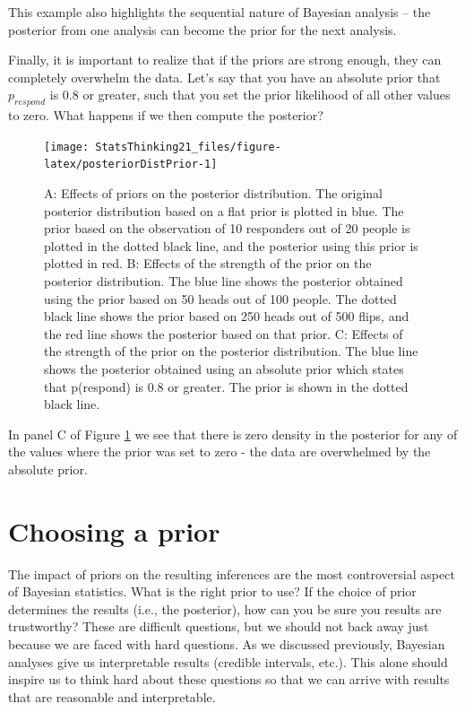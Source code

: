 \documentclass[12pt,]{book}
\theoremstyle{definition}
\theoremstyle{definition}
\theoremstyle{definition}
\theoremstyle{remark}
\begin{document}
This example also highlights the sequential nature of Bayesian analysis -- the posterior from one analysis can become the prior for the next analysis.

Finally, it is important to realize that if the priors are strong enough, they can completely overwhelm the data. Let's say that you have an absolute prior that \(p_{respond}\) is 0.8 or greater, such that you set the prior likelihood of all other values to zero. What happens if we then compute the posterior?

\begin{figure}
\texttt{[image: StatsThinking21\_files/figure-latex/posteriorDistPrior-1]} \caption{A: Effects of priors on the posterior distribution.  The original posterior distribution based on a flat prior is plotted in blue. The prior based on the observation of 10 responders out of 20 people is plotted in the dotted black line, and the posterior using this prior is plotted in red.  B: Effects of the strength of the prior on the posterior distribution. The blue line shows the posterior obtained using the prior based on 50 heads out of 100 people.  The dotted black line shows the prior based on 250 heads out of 500 flips, and the red line shows the posterior based on that prior. C: Effects of the strength of the prior on the posterior distribution. The blue line shows the posterior obtained using an absolute prior which states that p(respond) is 0.8 or greater.  The prior is shown in the dotted black line.}\label{fig:posteriorDistPrior}
\end{figure}

In panel C of Figure \ref{fig:posteriorDistPrior} we see that there is zero density in the posterior for any of the values where the prior was set to zero - the data are overwhelmed by the absolute prior.

\hypertarget{choosing-a-prior}{%
\section{Choosing a prior}\label{choosing-a-prior}}

The impact of priors on the resulting inferences are the most controversial aspect of Bayesian statistics. What is the right prior to use? If the choice of prior determines the results (i.e., the posterior), how can you be sure you results are trustworthy? These are difficult questions, but we should not back away just because we are faced with hard questions. As we discussed previously, Bayesian analyses give us interpretable results (credible intervals, etc.). This alone should inspire us to think hard about these questions so that we can arrive with results that are reasonable and interpretable.
\end{document}
